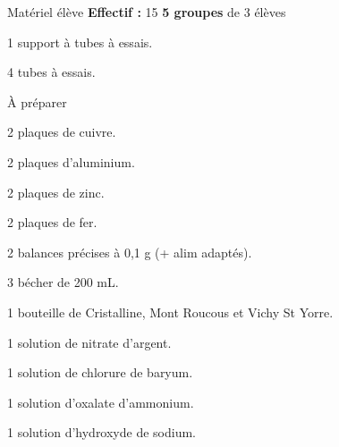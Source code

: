 
\begin{boiteMateriel}{Matériel élève}
  \textbf{Effectif :} 15
  \qq{}\qq{}
  \flecheLongue \textbf{5 groupes} de 3 élèves
  
  \begin{protocole}
    \item 1 support à tubes à essais.
    \item 4 tubes à essais.
  \end{protocole}
\end{boiteMateriel}


\begin{boiteMateriel}{À préparer}
  \begin{protocole}
    \item 2 plaques de cuivre.
    \item 2 plaques d'aluminium.
    \item 2 plaques de zinc.
    \item 2 plaques de fer.
    \item 2 balances précises à 0,1 g (+ alim adaptés).
    \item 3 bécher de 200 mL.
    \item 1 bouteille de Cristalline, Mont Roucous et Vichy St Yorre.
    \item 1 solution de nitrate d'argent.
    \item 1 solution de chlorure de baryum.
    \item 1 solution d'oxalate d'ammonium.
    \item 1 solution d'hydroxyde de sodium.
  \end{protocole}
\end{boiteMateriel}